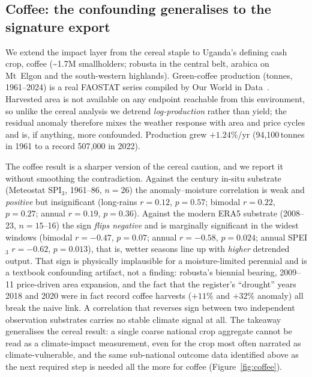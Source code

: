 \documentclass[preprint,12pt]{elsarticle}
\begin{document}
\subsection{Coffee: the confounding generalises to the signature export}
\label{sec:coffee}
We extend the impact layer from the cereal staple to Uganda's defining cash
crop, coffee (\textasciitilde1.7M smallholders; robusta in the central belt,
arabica on Mt\ Elgon and the south-western highlands). Green-coffee production
(tonnes, 1961--2024) is a real FAOSTAT series compiled by Our World in
Data~\cite{owid2025}. Harvested area is not available on any endpoint reachable
from this environment, so unlike the cereal analysis we detrend
\emph{log-production} rather than yield; the residual anomaly therefore mixes the
weather response
with area and price cycles and is, if anything, more confounded. Production grew
$+1.24\%$/yr (94{,}100\,tonnes in 1961 to a record 507{,}000 in 2022).

The coffee result is a sharper version of the cereal caution, and we report it
without smoothing the contradiction. Against the century in-situ substrate
(Meteostat SPI$_3$, 1961--86, $n{=}26$) the anomaly--moisture correlation is weak
and \emph{positive} but insignificant (long-rains $r=0.12$, $p=0.57$; bimodal
$r=0.22$, $p=0.27$; annual $r=0.19$, $p=0.36$). Against the modern ERA5 substrate
(2008--23, $n{=}15$--16) the sign \emph{flips negative} and is marginally
significant in the widest windows (bimodal $r=-0.47$, $p=0.07$; annual
$r=-0.58$, $p=0.024$; annual SPEI$_3$ $r=-0.62$, $p=0.013$), that is, wetter
seasons line up with \emph{higher} detrended output. That sign is physically
implausible for a moisture-limited perennial and is a textbook confounding
artifact, not a finding: robusta's biennial bearing, 2009--11 price-driven area
expansion, and the fact that the register's ``drought'' years 2018 and 2020 were
in fact record coffee harvests ($+11\%$ and $+32\%$ anomaly) all break the naive
link. A correlation that reverses sign between two independent observation
substrates carries no stable climate signal at all. The takeaway generalises the
cereal result: a single coarse national crop aggregate cannot be read as a
climate-impact measurement, even for the crop most often narrated as
climate-vulnerable, and the same sub-national outcome data identified above as the
next required step is needed all the more for coffee (Figure~\ref{fig:coffee}).
\end{document}
